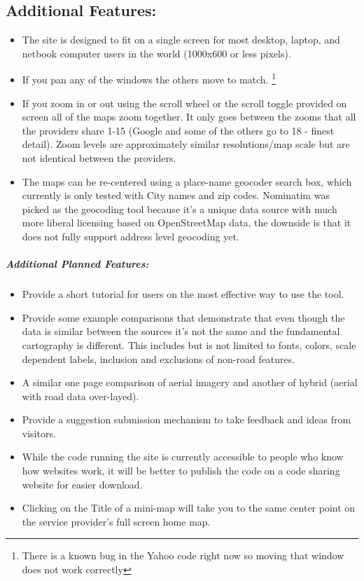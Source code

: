 \documentclass[12pt,letterpaper]{article}
\begin{document}
\subsection{Additional Features:}
\begin{itemize}
	\item The site is designed to fit on a single screen for most desktop, laptop, and netbook computer users in the world (1000x600 or less pixels).
	\item If you pan any of the windows the others move to match. \footnote{There is a known bug in the Yahoo code right now so moving that window does not work correctly}
	\item If you zoom in or out using the scroll wheel or the scroll toggle provided on screen all of the maps zoom together. It only goes between the zooms that all the providers share 1-15 (Google and some of the others go to 18 - finest detail). Zoom levels are approximately similar resolutions/map scale but are not identical between the providers.
	\item The maps can be re-centered using a place-name geocoder search box, which currently is only tested with City names and zip codes. Nominatim 	\parencite{Mapquest2012} was picked as the geocoding tool because it's a unique data source with much more liberal licensing based on OpenStreetMap data, the downside is that it does not fully support address level geocoding yet. 
\end{itemize}


\subparagraph{Additional Planned Features:}
\begin{itemize}
	\item Provide a short tutorial for users on the most effective way to use the tool.
	\item Provide some example comparisons that demonstrate that even though the data is similar between the sources it's not the same and the fundamental cartography is different. This includes but is not limited to fonts, colors, scale dependent labels, inclusion and exclusions of non-road features.
	\item A similar one page comparison of aerial imagery and another of hybrid (aerial with road data over-layed).
	\item Provide a suggestion submission mechanism to take feedback and ideas from visitors.
	\item While the code running the site is currently accessible to people who know how websites work, it will be better to publish the code on a code sharing website for easier download.
	\item Clicking on the Title of a mini-map will take you to the same center point on the service provider's full screen home map.
\end{itemize}
\end{document}
